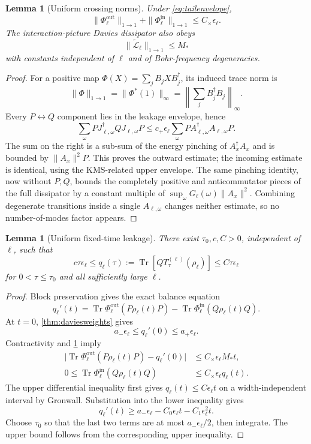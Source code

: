 \documentclass[11pt,a4paper]{article}
\newtheorem{lemma}[theorem]{Lemma}
\theoremstyle{remark}
\newcommand{\cL}{\mathcal L}
\DeclareMathOperator{\Tr}{Tr}
\begin{document}
\begin{lemma}[Uniform crossing norms]\label{lem:crossingnorm}
Under \cref{eq:tailenvelope},
\[
 \|\Phi_\ell^{\mathrm{out}}\|_{1\to1}
 +\|\Phi_\ell^{\mathrm{in}}\|_{1\to1}
 \le C_\times\epsilon_\ell.
\]
The interaction-picture Davies dissipator also obeys
\[
 \|\widetilde{\cL}_\ell\|_{1\to1}\le M_*
\]
with constants independent of $\ell$ and of Bohr-frequency degeneracies.
\end{lemma}

\begin{proof}
For a positive map $\Phi(X)=\sum_jB_jXB_j^\dagger$, its induced trace norm is
\[
 \|\Phi\|_{1\to1}=\|\Phi^*(1)\|_\infty
 =\left\|\sum_jB_j^\dagger B_j\right\|_\infty.
\]
Every $P\leftrightarrow Q$ component lies in the leakage envelope, hence
\[
 \sum_\omega PJ_{\ell,\omega}^\dagger QJ_{\ell,\omega}P
 \le c_+\epsilon_\ell
 \sum_\omega PA_{\ell,\omega}^\dagger A_{\ell,\omega}P.
\]
The sum on the right is a sub-sum of the energy pinching of $A_x^\dagger A_x$ and is bounded by $\|A_x\|^2P$.  This proves the outward estimate; the incoming estimate is identical, using the KMS-related upper envelope.  The same pinching identity, now without $P,Q$, bounds the completely positive and anticommutator pieces of the full dissipator by a constant multiple of $\sup_\omega G_\ell(\omega)\|A_x\|^2$.  Combining degenerate transitions inside a single $A_{\ell,\omega}$ changes neither estimate, so no number-of-modes factor appears.
\end{proof}

\begin{lemma}[Uniform fixed-time leakage]\label{lem:fixedleakage}
There exist $\tau_0,c,C>0$, independent of $\ell$, such that
\[
 c\tau\epsilon_\ell
 \le q_\ell(\tau):=\Tr[Q T_\tau^{(\ell)}(\rho_\ell)]
 \le C\tau\epsilon_\ell
\]
for $0<\tau\le\tau_0$ and all sufficiently large $\ell$.
\end{lemma}

\begin{proof}
Block preservation gives the exact balance equation
\[
 q_\ell'(t)
 =\Tr\Phi_\ell^{\mathrm{out}}(P\rho_\ell(t)P)
 -\Tr\Phi_\ell^{\mathrm{in}}(Q\rho_\ell(t)Q).
\]
At $t=0$, \cref{thm:daviesweights} gives
\[
 a_-\epsilon_\ell\le q_\ell'(0)\le a_+\epsilon_\ell.
\]
Contractivity and \cref{lem:crossingnorm} imply
\begin{align*}
 \bigl|\Tr\Phi_\ell^{\mathrm{out}}(P\rho_\ell(t)P)-q_\ell'(0)\bigr|
 &\le C_\times\epsilon_\ell M_*t,\\
 0\le\Tr\Phi_\ell^{\mathrm{in}}(Q\rho_\ell(t)Q)
 &\le C_\times\epsilon_\ell q_\ell(t).
\end{align*}
The upper differential inequality first gives $q_\ell(t)\le C\epsilon_\ell t$ on a width-independent interval by Gronwall.  Substitution into the lower inequality gives
\[
 q_\ell'(t)\ge a_-\epsilon_\ell-C_0\epsilon_\ell t-C_1\epsilon_\ell^2t.
\]
Choose $\tau_0$ so that the last two terms are at most $a_-\epsilon_\ell/2$, then integrate.  The upper bound follows from the corresponding upper inequality.
\end{proof}
\end{document}
